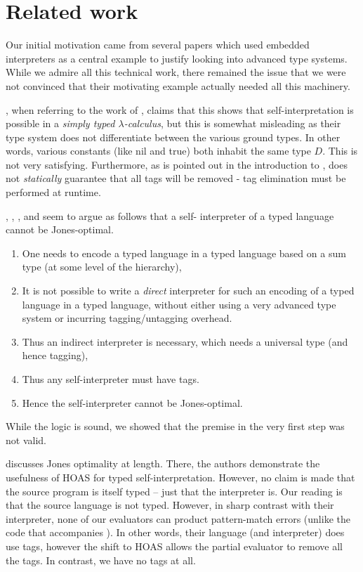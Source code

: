 \documentclass[preprint]{sigplanconf}
\begin{document}
\section{Related work}\label{related}

Our initial motivation came from several papers 
\citep{WalidICFP02,taha-tag,xi-guarded,peyton-jones-simple} which used
embedded interpreters as a central example to justify looking 
into advanced type systems.  While we admire all this technical work,
there remained the issue that we were not convinced that their 
motivating example actually needed all this machinery.

\citet{WalidICFP02}, when referring to the work of \citet{taha-tag},
claims that this shows that self-interpretation is possible in a
\emph{simply typed $\lambda$-calculus}, but this is somewhat misleading
as their type system does not differentiate between the various ground
types.  In other words, various constants (like \textsf{nil} and 
\textsf{true}) both inhabit the same type $D$.  This is not very satisfying.
Furthermore, as is pointed out in the introduction to \citet{WalidICFP02},
\citet{taha-tag} does not \emph{statically} guarantee that all tags will
be removed - tag elimination must be performed at runtime.

, \citet{taha-tag}, \citet{xi-guarded}, and
\citet{peyton-jones-simple} seem to argue as follows that a self\hyp
interpreter of a typed language cannot be Jones\hyp optimal.
\begin{enumerate}
\item One needs to encode a typed language in a typed language based on
a sum type (at some level of the hierarchy),
\item It is not possible to write a \emph{direct} interpreter 
for such an encoding of a typed language
in a typed language, without either using a
very advanced type system or incurring tagging/untagging overhead.
\item Thus an indirect interpreter is necessary, which needs a universal
  type (and hence tagging),
\item Thus any self-interpreter must have tags.
\item Hence the self-interpreter cannot be Jones-optimal.
\end{enumerate}
While the logic is sound, we showed that the premise in the very first step
was not valid.

\citet{Danvy-tagging-encoding} discusses Jones optimality at length.
There, the authors demonstrate the usefulness of HOAS for typed
self-interpretation.  However, no claim is made that the source program
is itself typed -- just that the interpreter is.  Our reading is that
the source language is not typed.  However, in sharp contrast with 
their interpreter, none of our evaluators can product pattern-match errors
(unlike the code that accompanies \citet{Danvy-tagging-encoding}).
In other words, their language (and interpreter) does use tags, however
the shift to HOAS allows the partial evaluator to remove all the tags.
In contrast, we have no tags at all.
\end{document}
